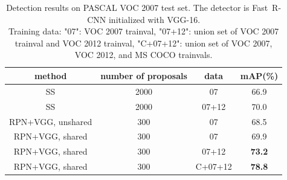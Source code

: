 \documentclass[conference]{IEEEtran}
\newcommand{\fast}[0]{\mbox{Fast~R-CNN}}
\begin{document}
\begin{table}[t]
\caption{\small{Detection results on PASCAL VOC 2007 test set. The detector is \fast{} initialized with VGG-16.\\Training data: "07": VOC 2007 trainval, "07+12": union set of VOC 2007 trainval and VOC 2012 trainval, "C+07+12": union set of VOC 2007, VOC 2012, and MS COCO trainvals.
}}
\begin{minipage}{\linewidth}
\begin{center}
\renewcommand\footnoterule{ \kern -1ex}
\begin{tabular}{c c|c|c}
method & number of proposals & data & mAP(\%)\\
\hline
\hline
SS & 2000 & 07 & 66.9\\
SS & 2000 & 07+12 & 70.0\\
\hline
RPN+VGG, unshared & 300 & 07 & 68.5\\
RPN+VGG, shared & 300 & 07 & 69.9\\
RPN+VGG, shared & 300 & 07+12 & \textbf{73.2}\\
\hline
RPN+VGG, shared & 300 & C+07+12 & \textbf{78.8}
\end{tabular}
\end{center}
\end{minipage}
\label{VOC2007Result}
\end{table}
\end{document}
